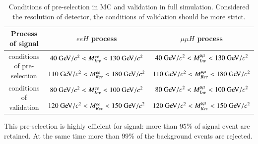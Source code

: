 \documentclass[11pt,a4paper]{cepcnote}
\begin{document}
\begin{table}[H]
\newcommand{\tabincell}[2]{\begin{tabular}{@{}#1@{}}#2\end{tabular}}
 \begin{center}
  \begin{tabular}{|c|c|c|}
  \hline \hline
  Process of signal				&		$eeH$ process						&				$\mu\mu H$ process\\
  \hline
  \multirow{2}{*}{conditions of pre-selection} 	&	$40\gev/c^2 < M_{Inv}^{ee} < 130\gev/c^2$&$40\gev/c^2 < M_{Inv}^{\mu\mu} < 130\gev/c^2$	\\
  											&	$110\gev/c^2 < M_{Rec}^{ee} < 180\gev/c^2$		&$110\gev/c^2 < M_{Rec}^{\mu\mu} < 180\gev/c^2$\\
  \hline
  \multirow{2}{*}{conditions of validation}	&	$80\gev/c^2 < M_{Inv}^{ee} < 100\gev/c^2$&$80\gev/c^2 < M_{Inv}^{\mu\mu} < 100\gev/c^2$	\\
  											&	$120\gev/c^2 < M_{Rec}^{ee} < 150\gev/c^2$		&$120\gev/c^2 < M_{Rec}^{\mu\mu} < 150\gev/c^2$\\
  \hline \hline
  \end{tabular}
  \caption[]{Conditions of pre-selection in MC and validation in full simulation. Considered the resolution of detector, the conditions of 
  validation should be more strict.}
  \label{tab:llhprecut}
 \end{center}
\end{table}
This pre-selection is highly efficient for signal: more than 95\% of signal event are retained. At the same time
more than 99\% of the background events are rejected. 
\end{document}
